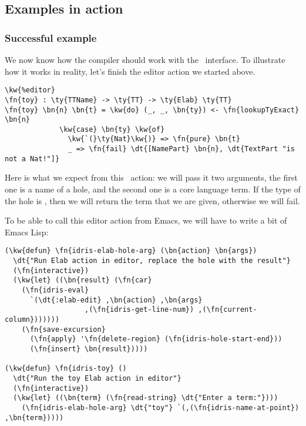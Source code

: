 \subsection{Examples in action}\label{ssec:designExample}

\subsubsection{Successful example}

We now know how the compiler should work with the \Editorable\ interface.
To illustrate how it works in reality, let's finish the  editor action
we started above.

\begin{Verbatim}[framesep=2mm, label=\footnotesize{\normalfont{Idris}}, labelposition=topline]
\kw{%editor}
\fn{toy} : \ty{TTName} -> \ty{TT} -> \ty{Elab} \ty{TT}
\fn{toy} \bn{n} \bn{t} = \kw{do} (_, _, \bn{ty}) <- \fn{lookupTyExact} \bn{n}
             \kw{case} \bn{ty} \kw{of}
               \kw{`(}\ty{Nat}\kw{)} => \fn{pure} \bn{t}
               _ => \fn{fail} \dt{[NamePart} \bn{n}, \dt{TextPart "is not a Nat!"]}
\end{Verbatim}

Here is what we expect from this \Elab\ action: we will pass it two arguments,
the first one is a name of a hole, and the second one is a core language term.
If the type of the hole is , then we will return the term that we are
given, otherwise we will fail.

To be able to call this editor action from Emacs, we will have to write a bit
of Emacs Lisp:

\begin{Verbatim}[framesep=2mm, label=\footnotesize{\normalfont{Emacs Lisp}}, labelposition=topline]
(\kw{defun} \fn{idris-elab-hole-arg} (\bn{action} \bn{args})
  \dt{"Run Elab action in editor, replace the hole with the result"}
  (\fn{interactive})
  (\kw{let} ((\bn{result} (\fn{car}
    (\fn{idris-eval}
      `(\dt{:elab-edit} ,\bn{action} ,\bn{args}
                   ,(\fn{idris-get-line-num}) ,(\fn{current-column}))))))
    (\fn{save-excursion}
      (\fn{apply} '\fn{delete-region} (\fn{idris-hole-start-end}))
      (\fn{insert} \bn{result}))))

(\kw{defun} \fn{idris-toy} ()
  \dt{"Run the toy Elab action in editor"}
  (\fn{interactive})
  (\kw{let} ((\bn{term} (\fn{read-string} \dt{"Enter a term:"})))
    (\fn{idris-elab-hole-arg} \dt{"toy"} `(,(\fn{idris-name-at-point}) ,\bn{term}))))
\end{Verbatim}

